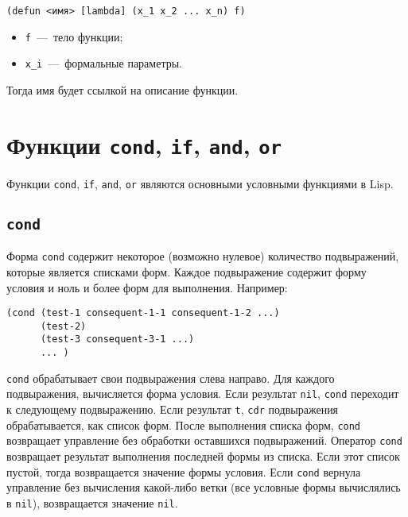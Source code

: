 \begin{code}
\begin{verbatim}
(defun <имя> [lambda] (x_1 x_2 ... x_n) f)
\end{verbatim}
\end{code}

\begin{itemize}
	\item \texttt{f}~---~тело функции;
	\item \texttt{x\_i}~---~формальные параметры. 
\end{itemize}

Тогда имя будет ссылкой на описание функции.

\section{Функции \texttt{cond}, \texttt{if}, \texttt{and}, \texttt{or}}
Функции \texttt{cond}, \texttt{if}, \texttt{and}, \texttt{or} являются основными условными функциями в Lisp.

\subsection{\texttt{cond}}
Форма \texttt{cond} содержит некоторое (возможно нулевое) количество подвыражений, которые является списками форм. Каждое подвыражение содержит форму условия и ноль и более форм для выполнения. Например:

\begin{code}
\begin{verbatim}
(cond (test-1 consequent-1-1 consequent-1-2 ...) 
      (test-2)
      (test-3 consequent-3-1 ...)
      ... )
\end{verbatim}
\end{code}

\texttt{cond} обрабатывает свои подвыражения слева направо. Для каждого подвыражения, вычисляется форма условия. Если результат \texttt{nil}, \texttt{cond} переходит к следующему подвыражению. Если результат \texttt{t}, \texttt{cdr} подвыражения обрабатывается, как список форм. После выполнения списка форм, \texttt{cond} возвращает управление без обработки оставшихся подвыражений. Оператор \texttt{cond} возвращает результат выполнения последней формы из списка. Если этот список пустой, тогда возвращается значение формы условия. Если \texttt{cond} вернула управление без вычисления какой-либо ветки (все условные формы вычислялись в \texttt{nil}), возвращается значение \texttt{nil}.


